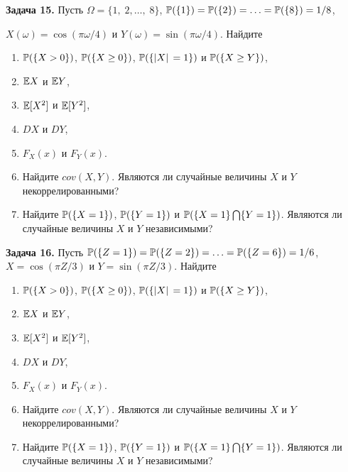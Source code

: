 \textbf{Задача 15.} Пусть $\Omega =\{ 1,\; 2,\ldots ,\; 8\} $, ${\rm {\mathbb P}}(\{ 1\} )={\rm {\mathbb P}}(\{ 2\} )=\ldots ={\rm {\mathbb P}}(\{ 8\} )=1/8$, 

$X(\omega )=\cos (\pi \omega /4)$ и $Y(\omega )=\sin (\pi \omega /4)$. Найдите

\begin{enumerate}
\item  ${\rm {\mathbb P}}(\{ X>0\} )$, ${\rm {\mathbb P}}(\{ X\ge 0\} )$, ${\rm {\mathbb P}}(\{ |X|\, =1\} )$ и ${\rm {\mathbb P}}(\{ X\ge Y\} )$, 

\item  ${\rm {\mathbb E}}X$ и ${\rm {\mathbb E}}Y$,

\item  ${\rm {\mathbb E}}[X^{2} ]$ и ${\rm {\mathbb E}}[Y^{2} ]$,

\item  $DX$ и $DY$,

\item  $F_{X} (x)$ и $F_{Y} (x)$.

\item  Найдите $cov(X,Y)$. Являются ли случайные величины $X$ и $Y$ некоррелированными?

\item  Найдите ${\rm {\mathbb P}}(\{ X=1\} )$, ${\rm {\mathbb P}}(\{ Y=1\} )$ и ${\rm {\mathbb P}}(\{ X=1\} \bigcap \{ Y=1\} )$. Являются ли случайные величины $X$ и $Y$ независимыми?
\end{enumerate}

\textbf{Задача 16.} Пусть ${\rm {\mathbb P}}(\{ Z=1\} )={\rm {\mathbb P}}(\{ Z=2\} )=\ldots ={\rm {\mathbb P}}(\{ Z=6\} )=1/6$, $X=\cos (\pi Z/3)$ и $Y=\sin (\pi Z/3)$. Найдите

\begin{enumerate}
\item  ${\rm {\mathbb P}}(\{ X>0\} )$, ${\rm {\mathbb P}}(\{ X\ge 0\} )$, ${\rm {\mathbb P}}(\{ |X|\, =1\} )$ и ${\rm {\mathbb P}}(\{ X\ge Y\} )$, 

\item  ${\rm {\mathbb E}}X$ и ${\rm {\mathbb E}}Y$,

\item  ${\rm {\mathbb E}}[X^{2} ]$ и ${\rm {\mathbb E}}[Y^{2} ]$,

\item  $DX$ и $DY$,

\item  $F_{X} (x)$ и $F_{Y} (x)$.

\item  Найдите $cov(X,Y)$. Являются ли случайные величины $X$ и $Y$ некоррелированными?

\item  Найдите ${\rm {\mathbb P}}(\{ X=1\} )$, ${\rm {\mathbb P}}(\{ Y=1\} )$ и ${\rm {\mathbb P}}(\{ X=1\} \bigcap \{ Y=1\} )$. Являются ли случайные величины $X$ и $Y$ независимыми?
\end{enumerate}


